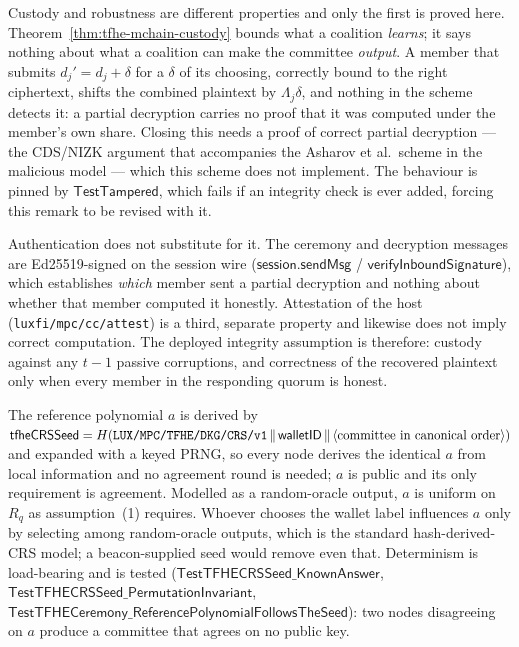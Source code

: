 \begin{remark}
\label{rem:tfhe-active-corruption}
Custody and robustness are different properties and only the first is proved
here. Theorem~\ref{thm:tfhe-mchain-custody} bounds what a coalition
\emph{learns}; it says nothing about what a coalition can make the committee
\emph{output}. A member that submits $d_j' = d_j + \delta$ for a $\delta$ of
its choosing, correctly bound to the right ciphertext, shifts the combined
plaintext by $\Lambda_j \delta$, and nothing in the scheme detects it: a
partial decryption carries no proof that it was computed under the member's own
share. Closing this needs a proof of correct partial decryption --- the
CDS/NIZK argument that accompanies the Asharov et al.\ scheme in the malicious
model --- which this scheme does not implement. The behaviour is pinned by
$\mathsf{TestTampered}$, which fails if an
integrity check is ever added, forcing this remark to be revised with it.

Authentication does not substitute for it. The ceremony and decryption messages
are Ed25519-signed on the session wire ($\mathsf{session.sendMsg}$ /
$\mathsf{verifyInboundSignature}$), which establishes \emph{which} member sent a
partial decryption and nothing about whether that member computed it honestly.
Attestation of the host (\texttt{luxfi/mpc/cc/attest}) is a third, separate
property and likewise does not imply correct computation. The deployed integrity
assumption is therefore: custody against any $t-1$ passive corruptions, and
correctness of the recovered plaintext only when every member in the responding
quorum is honest.
\end{remark}

\begin{remark}
\label{rem:tfhe-crs}
The reference polynomial $a$ is derived by
$\mathsf{tfheCRSSeed} = H(\text{\texttt{LUX/MPC/TFHE/DKG/CRS/v1}} \,\|\,
\mathsf{walletID} \,\|\, \langle \text{committee in canonical order}\rangle)$
and expanded with a keyed PRNG, so every node derives the identical $a$ from
local information and no agreement round is needed; $a$ is public and its only
requirement is agreement. Modelled as a random-oracle output, $a$ is uniform on
$R_q$ as assumption~(1) requires. Whoever chooses the wallet label influences
$a$ only by selecting among random-oracle outputs, which is the standard
hash-derived-CRS model; a beacon-supplied seed would remove even that.
Determinism is load-bearing and is tested
($\mathsf{TestTFHECRSSeed\_KnownAnswer}$,
$\mathsf{TestTFHECRSSeed\_PermutationInvariant}$,
$\mathsf{TestTFHECeremony\_ReferencePolynomialFollowsTheSeed}$): two nodes
disagreeing on $a$ produce a committee that agrees on no public key.
\end{remark}

